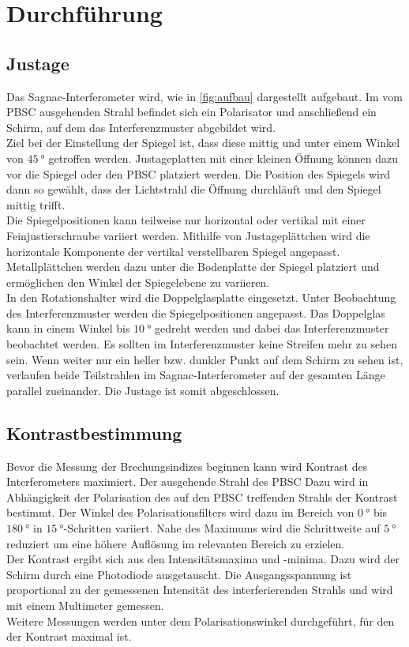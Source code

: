 \section{Durchführung}
\label{sec:Durchführung}

\subsection{Justage}
Das Sagnac-Interferometer wird, wie in \autoref{fig:aufbau} dargestellt aufgebaut.
Im vom PBSC ausgehenden Strahl befindet sich ein Polarisator und anschließend ein Schirm, auf dem das Interferenzmuster abgebildet wird.
\\
Ziel bei der Einstellung der Spiegel ist, dass diese mittig und unter einem Winkel von $\qty{45}{\degree}$ getroffen werden.
Justageplatten mit einer kleinen Öffnung können dazu vor die Spiegel oder den PBSC platziert werden.
Die Position des Spiegels wird dann so gewählt, dass der Lichtstrahl die Öffnung durchläuft und den Spiegel mittig trifft.
\\
Die Spiegelpositionen kann teilweise nur horizontal oder vertikal mit einer Feinjustierschraube variiert werden.
Mithilfe von Justageplättchen wird die horizontale Komponente der vertikal verstellbaren Spiegel angepasst.
Metallplättchen werden dazu unter die Bodenplatte der Spiegel platziert und ermöglichen den Winkel der Spiegelebene zu variieren.
\\
In den Rotationshalter wird die Doppelglasplatte eingesetzt.
Unter Beobachtung des Interferenzmuster werden die Spiegelpositionen angepasst.
Das Doppelglas kann in einem Winkel bis $\qty{10}{\degree}$ gedreht werden und dabei das Interferenzmuster beobachtet werden.
Es sollten im Interferenzmuster keine Streifen mehr zu sehen sein.
Wenn weiter nur ein heller bzw. dunkler Punkt auf dem Schirm zu sehen ist, verlaufen beide Teilstrahlen im Sagnac-Interferometer auf der gesamten Länge parallel zueinander.
Die Justage ist somit abgeschlossen.

\subsection{Kontrastbestimmung}
Bevor die Messung der Brechungsindizes beginnen kann wird Kontrast des Interferometers maximiert.
Der ausgehende Strahl des PBSC 
Dazu wird in Abhängigkeit der Polarisation des auf den PBSC treffenden Strahls der Kontrast bestimmt.
Der Winkel des Polarisationsfilters wird dazu im Bereich von $\qty{0}{\degree}$ bis $\qty{180}{\degree}$ in $\qty{15}{\degree}$-Schritten variiert.
Nahe des Maximums wird die Schrittweite auf $\qty{5}{\degree}$ reduziert um eine höhere Auflösung im relevanten Bereich zu erzielen.
\\
Der Kontrast ergibt sich aus den Intensitätsmaxima und -minima.
Dazu wird der Schirm durch eine Photodiode ausgetauscht.
Die Ausgangsspannung ist proportional zu der gemessenen Intensität des interferierenden Strahls und wird mit einem Multimeter gemessen.
\\
Weitere Messungen werden unter dem Polarisationswinkel durchgeführt, für den der Kontrast maximal ist.

